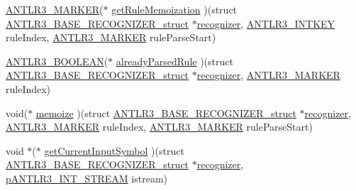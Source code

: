\begin{DoxyCompactItemize}
\item 
\hyperlink{antlr3defs_8h_a0361e6bf442e07afe923e4d05e9ebc4f}{A\-N\-T\-L\-R3\-\_\-\-M\-A\-R\-K\-E\-R}($\ast$ \hyperlink{struct_a_n_t_l_r3___b_a_s_e___r_e_c_o_g_n_i_z_e_r__struct_a681d3122d2203351989f1cfd482f3c8d}{get\-Rule\-Memoization} )(struct \hyperlink{struct_a_n_t_l_r3___b_a_s_e___r_e_c_o_g_n_i_z_e_r__struct}{A\-N\-T\-L\-R3\-\_\-\-B\-A\-S\-E\-\_\-\-R\-E\-C\-O\-G\-N\-I\-Z\-E\-R\-\_\-struct} $\ast$\hyperlink{struct_a_n_t_l_r3___b_a_s_e___r_e_c_o_g_n_i_z_e_r__struct_aa7ab273aa44860cea6cd6e41528b57af}{recognizer}, \hyperlink{antlr3defs_8h_aa5533fd558adc28dc2af0039f52324a8}{A\-N\-T\-L\-R3\-\_\-\-I\-N\-T\-K\-E\-Y} rule\-Index, \hyperlink{antlr3defs_8h_a0361e6bf442e07afe923e4d05e9ebc4f}{A\-N\-T\-L\-R3\-\_\-\-M\-A\-R\-K\-E\-R} rule\-Parse\-Start)
\item 
\hyperlink{antlr3defs_8h_a5b33dccbba3b7212539695e21df4079b}{A\-N\-T\-L\-R3\-\_\-\-B\-O\-O\-L\-E\-A\-N}($\ast$ \hyperlink{struct_a_n_t_l_r3___b_a_s_e___r_e_c_o_g_n_i_z_e_r__struct_a744bf4a5301c39c7b357d16589705609}{already\-Parsed\-Rule} )(struct \hyperlink{struct_a_n_t_l_r3___b_a_s_e___r_e_c_o_g_n_i_z_e_r__struct}{A\-N\-T\-L\-R3\-\_\-\-B\-A\-S\-E\-\_\-\-R\-E\-C\-O\-G\-N\-I\-Z\-E\-R\-\_\-struct} $\ast$\hyperlink{struct_a_n_t_l_r3___b_a_s_e___r_e_c_o_g_n_i_z_e_r__struct_aa7ab273aa44860cea6cd6e41528b57af}{recognizer}, \hyperlink{antlr3defs_8h_a0361e6bf442e07afe923e4d05e9ebc4f}{A\-N\-T\-L\-R3\-\_\-\-M\-A\-R\-K\-E\-R} rule\-Index)
\item 
void($\ast$ \hyperlink{struct_a_n_t_l_r3___b_a_s_e___r_e_c_o_g_n_i_z_e_r__struct_a7d5834d01d2619a5d110f8554aba2074}{memoize} )(struct \hyperlink{struct_a_n_t_l_r3___b_a_s_e___r_e_c_o_g_n_i_z_e_r__struct}{A\-N\-T\-L\-R3\-\_\-\-B\-A\-S\-E\-\_\-\-R\-E\-C\-O\-G\-N\-I\-Z\-E\-R\-\_\-struct} $\ast$\hyperlink{struct_a_n_t_l_r3___b_a_s_e___r_e_c_o_g_n_i_z_e_r__struct_aa7ab273aa44860cea6cd6e41528b57af}{recognizer}, \hyperlink{antlr3defs_8h_a0361e6bf442e07afe923e4d05e9ebc4f}{A\-N\-T\-L\-R3\-\_\-\-M\-A\-R\-K\-E\-R} rule\-Index, \hyperlink{antlr3defs_8h_a0361e6bf442e07afe923e4d05e9ebc4f}{A\-N\-T\-L\-R3\-\_\-\-M\-A\-R\-K\-E\-R} rule\-Parse\-Start)
\item 
void $\ast$($\ast$ \hyperlink{struct_a_n_t_l_r3___b_a_s_e___r_e_c_o_g_n_i_z_e_r__struct_ac4568c30a45bc9b1eb0ad72373ccc774}{get\-Current\-Input\-Symbol} )(struct \hyperlink{struct_a_n_t_l_r3___b_a_s_e___r_e_c_o_g_n_i_z_e_r__struct}{A\-N\-T\-L\-R3\-\_\-\-B\-A\-S\-E\-\_\-\-R\-E\-C\-O\-G\-N\-I\-Z\-E\-R\-\_\-struct} $\ast$\hyperlink{struct_a_n_t_l_r3___b_a_s_e___r_e_c_o_g_n_i_z_e_r__struct_aa7ab273aa44860cea6cd6e41528b57af}{recognizer}, \hyperlink{antlr3interfaces_8h_af34d949f6aa442e8e7770e420977d338}{p\-A\-N\-T\-L\-R3\-\_\-\-I\-N\-T\-\_\-\-S\-T\-R\-E\-A\-M} istream)

\end{DoxyCompactItemize}
